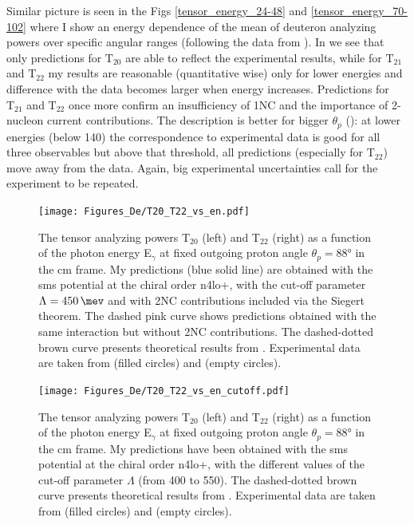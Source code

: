     Similar picture is seen in the Figs \ref{tensor_energy_24-48} and \ref{tensor_energy_70-102}
    where I show an energy dependence of the mean of deuteron analyzing powers over 
    specific angular ranges (following the data from \cite{rachek2007}).
    In  we see that only predictions for $\text{T}_{20}$ are able to reflect the experimental results,
    while for $\text{T}_{21}$ and $\text{T}_{22}$ my results are reasonable (quantitative wise) 
    only for lower energies and difference with the data becomes larger
    when energy increases. Predictions for $\text{T}_{21}$ and $\text{T}_{22}$ once more 
    confirm an insufficiency of 1NC and the importance of
    2-nucleon current contributions.
    The description is better for bigger $\theta_p$ ():
    at lower energies (below \SI{140}{\mev}) the correspondence to
    experimental data is good for all three observables but above that 
    threshold, all predictions (especially for $\text{T}_{22}$)
    move away from the data.
    Again, big experimental uncertainties call for the experiment to be repeated.
    

    \begin{figure}[h]
        \begin{center}
        \texttt{[image: Figures\_De/T20\_T22\_vs\_en.pdf]}
        \end{center}
        \caption{
        The tensor analyzing powers T$_{20}$ (left) and T$_{22}$ (right) as
        a function of the photon energy E$_\gamma$
        at fixed outgoing proton angle $\theta_p = \ang{88}$ in the \gls{cm} frame.
        My predictions (blue solid line) are obtained with the \gls{sms} potential at the chiral order \gls{n4lo+},
        with the cut-off parameter $\Lambda = \SI{450}{\mev}$ and with 2NC contributions included via the Siegert theorem.
        The dashed pink curve shows predictions obtained with the same interaction but without 2NC contributions.
        The dashed-dotted brown curve presents theoretical results from \cite{Schmitt1989}.
        Experimental data are taken from \cite{rachek2007} (filled circles)
        and \cite{mishev1993} (empty circles).}
        \label{T20_vs_en}
    \end{figure}

    \begin{figure}[h]
        \begin{center}
        \texttt{[image: Figures\_De/T20\_T22\_vs\_en\_cutoff.pdf]}
        \end{center}
        \caption{
        The tensor analyzing powers T$_{20}$ (left) and T$_{22}$ (right) as
        a function of the photon energy E$_\gamma$
        at fixed outgoing proton angle $\theta_p = \ang{88}$ in the \gls{cm} frame.
        My predictions have been obtained with the \gls{sms} potential at the chiral order \gls{n4lo+},
        with the different values of the cut-off parameter $\Lambda$ (from \SI{400}{\mev} to \SI{550}{\mev}).
        The dashed-dotted brown curve presents theoretical results from \cite{Schmitt1989}.
        Experimental data are taken from \cite{rachek2007} (filled circles)
        and \cite{mishev1993} (empty circles).}
        \label{T20_vs_en_cutoff}
    \end{figure}

